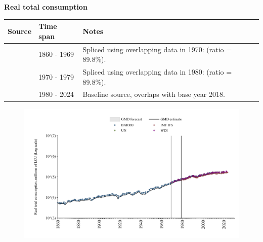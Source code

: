 \documentclass[12pt,a4paper,landscape]{article}
\begin{document}
\begin{adjustbox}{max totalsize={\paperwidth}{\paperheight},center}
\begin{minipage}[t][\textheight][t]{\textwidth}
\vspace*{0.5cm}
{}
\begin{center}
{\Large\bfseries Real total consumption}
\end{center}
\vspace{0.5cm}
\begin{table}[H]
\centering
\small
\begin{tabular}{|l|l|l|}
\hline
\textbf{Source} & \textbf{Time span} & \textbf{Notes} \\
\hline
\rowcolor{white}\cite{BARRO}& 1860 - 1969 &Spliced using overlapping data in 1970: (ratio = 89.8\%). \\
\rowcolor{lightgray}\cite{WDI}& 1970 - 1979 &Spliced using overlapping data in 1980: (ratio = 89.8\%). \\
\rowcolor{white}\cite{IMF_IFS}& 1980 - 2024 &Baseline source, overlaps with base year 2018. \\
\hline
\end{tabular}
\end{table}
\begin{figure}[H]
\centering
\includegraphics[width=\textwidth,height=0.6\textheight,keepaspectratio]{graphs/FIN_rcons.pdf}
\end{figure}
\end{minipage}
\end{adjustbox}
\end{document}

